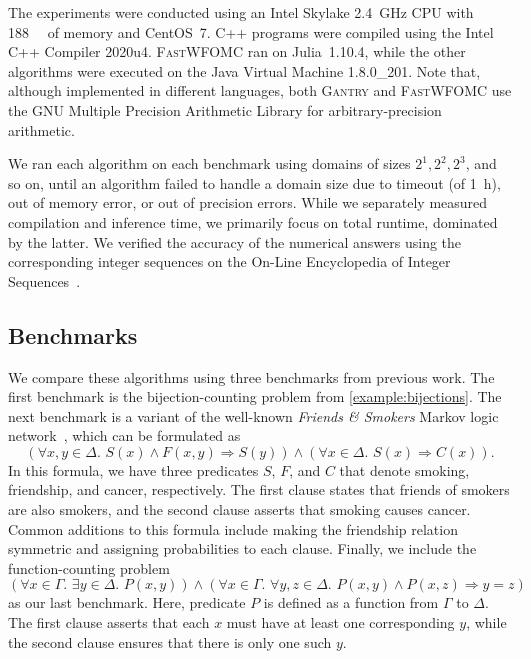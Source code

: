 \documentclass[a4paper,UKenglish,cleveref, autoref, thm-restate]{lipics-v2021}
\newcommand{\Cranetwo}{\textsc{Gantry}}
\newcommand{\friends}{\emph{Friends \& Smokers}}
\begin{document}
The experiments were conducted using an Intel Skylake \SI{2.4}{\giga\hertz} CPU
with \SI{188}{\gibi\byte} of memory and CentOS~7. C++ programs were compiled
using the Intel C++ Compiler 2020u4. \textsc{FastWFOMC} ran on Julia~1.10.4,
while the other algorithms were executed on the Java Virtual Machine 1.8.0\_201.
Note that, although implemented in different languages, both \Cranetwo{} and
\textsc{FastWFOMC} use the GNU Multiple Precision Arithmetic Library for
arbitrary-precision arithmetic.

We ran each algorithm on each benchmark using domains of sizes
$2^{1}, 2^{2}, 2^{3}$, and so on, until an algorithm failed to handle a domain
size due to timeout (of \SI{1}{\hour}), out of memory error, or out of precision
errors. While we separately measured compilation and inference time, we
primarily focus on total runtime, dominated by the latter. We verified the
accuracy of the numerical answers using the corresponding integer sequences on
the On-Line Encyclopedia of Integer Sequences~\cite{oeis}.

\subsection{Benchmarks}

We compare these algorithms using three benchmarks from previous work. The first
benchmark is the bijection-counting problem from \cref{example:bijections}. The
next benchmark is a variant of the well-known \friends{} Markov logic
network~\cite{DBLP:conf/aaai/SinglaD08,DBLP:conf/uai/BroeckCD12}, which can be
formulated as
\[
  (\forall x,y \in \Delta\text{.
  } S(x) \land F(x, y) \Rightarrow S(y)) \land (\forall x \in \Delta\text{.
  }S(x) \Rightarrow C(x)).
\]
In this formula, we have three predicates $S$, $F$, and $C$ that denote smoking,
friendship, and cancer, respectively. The first clause states that friends of
smokers are also smokers, and the second clause asserts that smoking causes
cancer. Common additions to this formula include making the friendship relation
symmetric and assigning probabilities to each clause. Finally, we include the
function-counting problem~\cite{DBLP:conf/kr/DilkasB23}
\[
  (\forall x \in \Gamma\text{. }\exists y \in \Delta\text{.
  }P(x, y)) \land (\forall x \in \Gamma\text{. }\forall y, z \in \Delta\text{.
  }P(x, y) \land P(x, z) \Rightarrow y = z)
\]
as our last benchmark. Here, predicate $P$ is defined as a function from
$\Gamma$ to $\Delta$. The first clause asserts that each $x$ must have at least
one corresponding $y$, while the second clause ensures that there is only one
such $y$.
\end{document}
